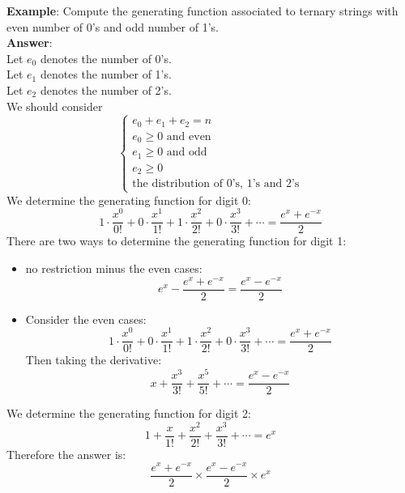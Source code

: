 \noindent \textbf{Example}: Compute the generating function associated to ternary strings with even number of 0's and odd number of 1's.\\
\textbf{Answer}:\\
Let $e_0$ denotes the number of 0's.\\
Let $e_1$ denotes the number of 1's.\\
Let $e_2$ denotes the number of 2's.\\
We should consider
\begin{equation}
    \begin{cases}
        e_0+e_1+e_2=n\\
        e_0 \geq 0 \text{ and even}\\
        e_1 \geq 0 \text{ and odd}\\
        e_2 \geq 0\\
        \text{the distribution of 0's, 1's and 2's}
    \end{cases}
\end{equation}
We determine the generating function for digit 0:
$$1 \cdot \frac{x^0}{0!} + 0 \cdot \frac{x^1}{1!} + 1 \cdot \frac{x^2}{2!}+ 0 \cdot \frac{x^3}{3!} + \cdots=\frac{e^x+e^{-x}}{2}$$
There are two ways to determine the generating function for digit 1:
\begin{itemize}
    \item no restriction minus the even cases: $$e^x-\frac{e^x+e^{-x}}{2}=\frac{e^x-e^{-x}}{2}$$
    \item Consider the even cases: $$1 \cdot \frac{x^0}{0!} + 0 \cdot \frac{x^1}{1!} + 1 \cdot \frac{x^2}{2!}+ 0 \cdot \frac{x^3}{3!} + \cdots=\frac{e^x+e^{-x}}{2}$$
    Then taking the derivative: $$x+\frac{x^3}{3!}+\frac{x^5}{5!}+ \cdots= \frac{e^x-e^{-x}}{2}$$
\end{itemize}
We determine the generating function for digit 2:
$$1+\frac{x}{1!}+\frac{x^2}{2!}+\frac{x^3}{3!}+ \cdots=e^x$$
Therefore the answer is:
$$\frac{e^x+e^{-x}}{2} \times \frac{e^x-e^{-x}}{2} \times e^x$$